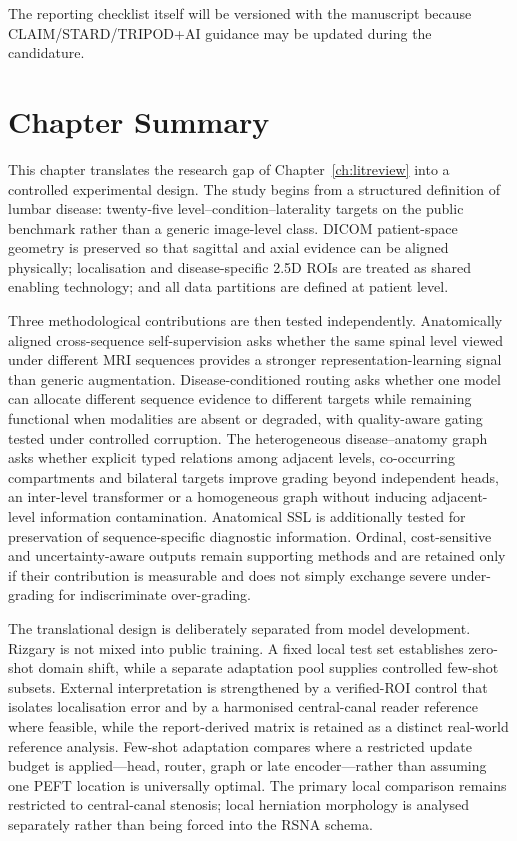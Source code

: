 The reporting checklist itself will be versioned with the manuscript because
CLAIM\slash STARD\slash TRIPOD+AI guidance may be updated during the
candidature.

\section{Chapter Summary}
\label{sec:method-summary}

This chapter translates the research gap of Chapter~\ref{ch:litreview} into a
controlled experimental design. The study begins from a structured definition
of lumbar disease: twenty-five level--condition--laterality targets on the
public benchmark rather than a generic image-level class. DICOM patient-space
geometry is preserved so that sagittal and axial evidence can be aligned
physically; localisation and disease-specific 2.5D ROIs are treated as shared
enabling technology; and all data partitions are defined at patient level.

Three methodological contributions are then tested independently. Anatomically
aligned cross-sequence self-supervision asks whether the same spinal level
viewed under different MRI sequences provides a stronger representation-learning
signal than generic augmentation. Disease-conditioned routing asks whether one
model can allocate different sequence evidence to different targets while
remaining functional when modalities are absent or degraded, with quality-aware
gating tested under controlled corruption. The heterogeneous disease--anatomy
graph asks whether explicit typed relations among adjacent levels, co-occurring
compartments and bilateral targets improve grading beyond independent heads, an
inter-level transformer or a homogeneous graph without inducing adjacent-level
information contamination. Anatomical SSL is additionally tested for preservation
of sequence-specific diagnostic information. Ordinal, cost-sensitive and
uncertainty-aware outputs remain supporting methods and are retained only if
their contribution is measurable and does not simply exchange severe
under-grading for indiscriminate over-grading.

The translational design is deliberately separated from model development.
Rizgary is not mixed into public training. A fixed local test set establishes
zero-shot domain shift, while a separate adaptation pool supplies controlled
few-shot subsets. External interpretation is strengthened by a verified-ROI
control that isolates localisation error and by a harmonised central-canal
reader reference where feasible, while the report-derived matrix is retained
as a distinct real-world reference analysis. Few-shot adaptation compares
where a restricted update budget is applied---head, router, graph or late
encoder---rather than assuming one PEFT location is universally optimal. The
primary local comparison remains restricted to central-canal stenosis; local
herniation morphology is analysed separately rather than being forced into the
RSNA schema.

